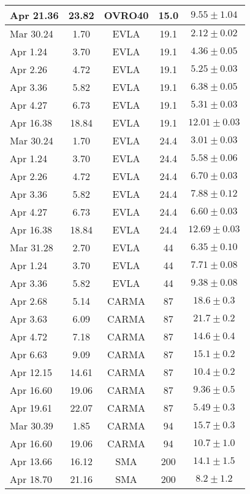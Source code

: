 \begin{center}
\begin{longtable}{lcccc}
Apr 21.36   & 23.82 & OVRO40 & 15.0 & $9.55\pm 1.04$ \\\hline
%
Mar 30.24   & 1.70 & EVLA & 19.1 & $2.12\pm 0.02$   \\
Apr 1.24    & 3.70 & EVLA & 19.1 & $4.36\pm 0.05$   \\
Apr 2.26    & 4.72 & EVLA & 19.1 & $5.25\pm 0.03$   \\
Apr 3.36    & 5.82 & EVLA & 19.1 & $6.38\pm 0.05$   \\
Apr 4.27    & 6.73 & EVLA & 19.1 & $5.31\pm 0.03$   \\
Apr 16.38   & 18.84 & EVLA & 19.1 & $12.01\pm 0.03$  \\\hline
%				   	 	   
Mar 30.24   & 1.70 & EVLA & 24.4 & $3.01\pm 0.03$   \\
Apr 1.24    & 3.70 & EVLA & 24.4 & $5.58\pm 0.06$   \\
Apr 2.26    & 4.72 & EVLA & 24.4 & $6.70\pm 0.03$   \\
Apr 3.36    & 5.82 & EVLA & 24.4 & $7.88\pm 0.12$   \\
Apr 4.27    & 6.73 & EVLA & 24.4 & $6.60\pm 0.03$   \\
Apr 16.38   & 18.84 & EVLA & 24.4 & $12.69\pm 0.03$  \\\hline
%
Mar 31.28   & 2.70 & EVLA & 44 & $6.35\pm 0.10$  \\
Apr 1.24    & 3.70 & EVLA & 44 & $7.71\pm 0.08$  \\
Apr 3.36    & 5.82 & EVLA & 44 & $9.38\pm 0.08$  \\\hline
%
Apr 2.68    & 5.14  & CARMA & 87 & $18.6\pm 0.3$   \\
Apr 3.63    & 6.09  & CARMA & 87 & $21.7\pm 0.2$   \\
Apr 4.72    & 7.18  & CARMA & 87 & $14.6\pm 0.4$   \\
Apr 6.63    & 9.09  & CARMA & 87 & $15.1\pm 0.2$   \\
Apr 12.15   & 14.61 & CARMA & 87 & $10.4\pm 0.2$   \\
Apr 16.60   & 19.06 & CARMA & 87 & $9.36\pm 0.5$   \\
Apr 19.61   & 22.07 & CARMA & 87 & $5.49\pm 0.3$   \\\hline
%
Mar 30.39   & 1.85  & CARMA & 94 & $15.7\pm 0.3$   \\
Apr 16.60   & 19.06 & CARMA & 94 & $10.7\pm 1.0$   \\\hline
%
Apr 13.66   & 16.12 & SMA & 200 & $14.1\pm 1.5$    \\
Apr 18.70   & 21.16 & SMA & 200 & $8.2\pm 1.2$     \\

\end{longtable}
\end{center}
